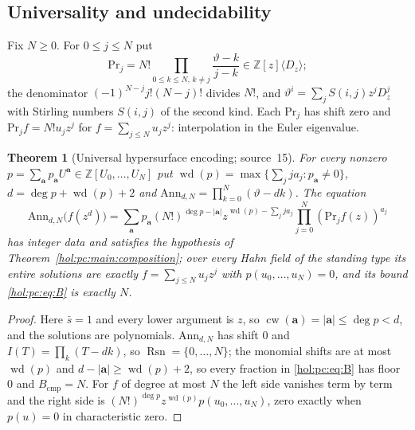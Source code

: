 \documentclass[11pt]{article}
\numberwithin{equation}{section}
\newtheorem{theorem}{Theorem}[section]
\theoremstyle{definition}
\theoremstyle{remark}
\newcommand{\Z}{\mathbb Z}
\newcommand{\abs}[1]{\lvert#1\rvert}
\begin{document}
\subsection{Universality and undecidability}\label{hol:pc:sub:universal}

Fix $N\ge0$. For $0\le j\le N$ put
\begin{equation}\label{hol:pc:eq:projector}
 \mathrm{Pr}_j=N!\prod_{0\le k\le N,\,k\ne j}\frac{\vartheta-k}{j-k}
 \in\Z[z]\langle D_z\rangle ;
\end{equation}
the denominator $(-1)^{N-j}j!(N-j)!$ divides $N!$, and
$\vartheta^i=\sum_jS(i,j)z^jD_z^j$ with Stirling numbers $S(i,j)$ of the second
kind. Each $\mathrm{Pr}_j$ has shift
zero and $\mathrm{Pr}_jf=N!u_jz^j$ for $f=\sum_{j\le N}u_jz^j$: interpolation in
the Euler eigenvalue.

\begin{theorem}[Universal hypersurface encoding; source~15]
\label{hol:pc:thm:universal}
For every nonzero $p=\sum_{\mathbf a}p_{\mathbf a}U^{\mathbf a}\in\Z[U_0,\ldots,
U_N]$ put $\operatorname{wd}(p)=\max\{\sum_jja_j:p_{\mathbf a}\ne0\}$,
$d=\deg p+\operatorname{wd}(p)+2$ and $\mathrm{Ann}_{d,N}=\prod_{k=0}^N
(\vartheta-dk)$. The equation
\begin{equation}\label{hol:pc:eq:encoding}
 \mathrm{Ann}_{d,N}\bigl(f(z^d)\bigr)=\sum_{\mathbf a}p_{\mathbf a}
 (N!)^{\deg p-\abs{\mathbf a}}z^{\operatorname{wd}(p)-\sum_jja_j}\prod_{j=0}^N
 (\mathrm{Pr}_jf(z))^{a_j}
\end{equation}
has integer data and satisfies the hypothesis of
Theorem~\ref{hol:pc:main:composition}; over every Hahn field of the standing
type its entire solutions are exactly $f=\sum_{j\le N}u_jz^j$ with
$p(u_0,\ldots,u_N)=0$, and its bound \eqref{hol:pc:eq:B} is exactly $N$.
\end{theorem}

\begin{proof}
Here $\bar s=1$ and every lower argument is $z$, so
$\operatorname{cw}(\mathbf a)=\abs{\mathbf a}\le\deg p<d$, and the solutions are
polynomials. $\mathrm{Ann}_{d,N}$ has shift $0$ and $I(T)=\prod_k(T-dk)$, so
$\operatorname{Rsn}=\{0,\ldots,N\}$; the monomial shifts are at most
$\operatorname{wd}(p)$ and $d-\abs{\mathbf a}\ge\operatorname{wd}(p)+2$, so every
fraction in \eqref{hol:pc:eq:B} has floor $0$ and $B_{\mathrm{cmp}}=N$. For $f$ of
degree at most $N$ the left side vanishes term by term and the right side is
$(N!)^{\deg p}z^{\operatorname{wd}(p)}p(u_0,\ldots,u_N)$, zero exactly when
$p(u)=0$ in characteristic zero.
\end{proof}
\end{document}
